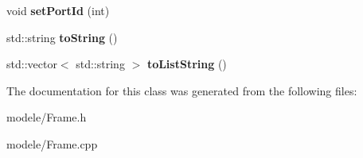 \begin{DoxyCompactItemize}
\item 
\hypertarget{class_frame_a711c2cb73c94a38b878b38316cc1934e}{void {\bfseries set\-Port\-Id} (int)}\label{class_frame_a711c2cb73c94a38b878b38316cc1934e}

\item 
\hypertarget{class_frame_a90f5bd61b1e201b488d3a6f25996f8e4}{std\-::string {\bfseries to\-String} ()}\label{class_frame_a90f5bd61b1e201b488d3a6f25996f8e4}

\item 
\hypertarget{class_frame_aabccb15db0ed6efe02716d709648ef87}{std\-::vector$<$ std\-::string $>$ {\bfseries to\-List\-String} ()}\label{class_frame_aabccb15db0ed6efe02716d709648ef87}

\end{DoxyCompactItemize}


The documentation for this class was generated from the following files\-:\begin{DoxyCompactItemize}
\item 
modele/Frame.\-h\item 
modele/Frame.\-cpp\end{DoxyCompactItemize}
